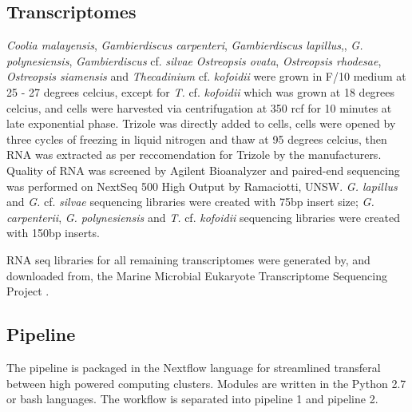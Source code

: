 \documentclass[12pt]{article}
\begin{document}
\subsection*{Transcriptomes}
\emph{Coolia malayensis}, \emph{Gambierdiscus carpenteri}, \emph{Gambierdiscus lapillus},, \emph{G. polynesiensis}, \emph{Gambierdiscus} cf. \emph{silvae} \emph{Ostreopsis ovata}, \emph{Ostreopsis rhodesae}, \emph{Ostreopsis siamensis} and \emph{Thecadinium} cf. \emph{kofoidii} were grown in F/10 medium at 25 - 27 degrees celcius, except for \emph{T.} cf. \emph{kofoidii} which was grown at 18 degrees celcius, and cells were harvested via centrifugation at 350 rcf for 10 minutes at late exponential phase. Trizole was directly added to cells, cells were opened by three cycles of freezing in liquid nitrogen and thaw at 95 degrees celcius, then RNA was extracted as per reccomendation for Trizole by the manufacturers. Quality of RNA was screened by Agilent Bioanalyzer and paired-end sequencing was performed on NextSeq 500 High Output by Ramaciotti, UNSW. \emph{G. lapillus} and \emph{G.} cf. \emph{silvae} sequencing libraries were created with 75bp insert size; \emph{G. carpenterii}, \emph{G. polynesiensis} and \emph{T.} cf. \emph{kofoidii} sequencing libraries were created with 150bp inserts.

RNA seq libraries for all remaining transcriptomes were generated by, and downloaded from, the Marine Microbial Eukaryote Transcriptome Sequencing Project \citep{keeling2014marine}.

\subsection*{Pipeline}
The pipeline is packaged in the Nextflow language for streamlined transferal between high powered computing clusters. Modules are written in the Python 2.7 or bash languages. The workflow is separated into pipeline 1 and pipeline 2. 
\end{document}
